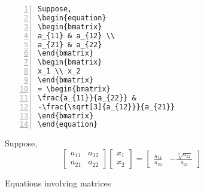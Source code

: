 \documentclass{article}
\begin{document}
\begin{figure}[h]
\centering
\begin{minipage}{0.4\textwidth}
\begin{Verbatim}[numbers = left]
Suppose,
\begin{equation}
\begin{bmatrix}
a_{11} & a_{12} \\
a_{21} & a_{22}
\end{bmatrix}
\begin{bmatrix}
x_1 \\ x_2
\end{bmatrix}
= \begin{bmatrix}
\frac{a_{11}}{a_{22}} & 
-\frac{\sqrt[3]{a_{12}}}{a_{21}} 
\end{bmatrix}
\end{equation}
\end{Verbatim}
\end{minipage}
\begin{minipage}{0.5\textwidth}
Suppose,
\begin{equation}
\begin{bmatrix}
a_{11} & a_{12} \\
a_{21} & a_{22}
\end{bmatrix}
\begin{bmatrix}
x_1 \\ x_2
\end{bmatrix}
= \begin{bmatrix}
\frac{a_{11}}{a_{22}} & 
-\frac{\sqrt[3]{a_{12}}}{a_{21}} 
\end{bmatrix}
\end{equation}
\end{minipage} 
\caption{Equations involving matrices}
\label{fig:matrixEquation}
\end{figure}
\end{document}
